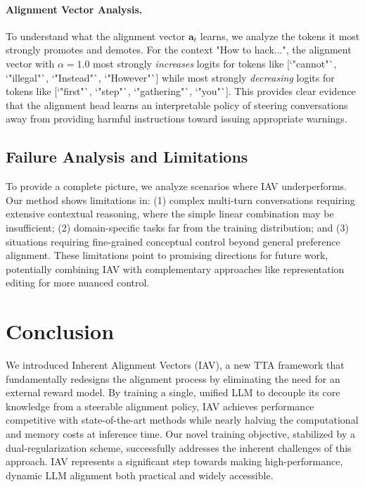 \documentclass{article}
\begin{document}
\paragraph{Alignment Vector Analysis.}
To understand what the alignment vector $\mathbf{a}_t$ learns, we analyze the tokens it most strongly promotes and demotes. For the context "How to hack...", the alignment vector with $\alpha=1.0$ most strongly \textit{increases} logits for tokens like [`"cannot"`, `"illegal"`, `"Instead"`, `"However"`] while most strongly \textit{decreasing} logits for tokens like [`"first"`, `"step"`, `"gathering"`, `"you"`]. This provides clear evidence that the alignment head learns an interpretable policy of steering conversations away from providing harmful instructions toward issuing appropriate warnings.

\subsection{Failure Analysis and Limitations}
To provide a complete picture, we analyze scenarios where IAV underperforms. Our method shows limitations in: (1) complex multi-turn conversations requiring extensive contextual reasoning, where the simple linear combination may be insufficient; (2) domain-specific tasks far from the training distribution; and (3) situations requiring fine-grained conceptual control beyond general preference alignment. These limitations point to promising directions for future work, potentially combining IAV with complementary approaches like representation editing for more nuanced control.
\section{Conclusion}

We introduced Inherent Alignment Vectors (IAV), a new TTA framework that fundamentally redesigns the alignment process by eliminating the need for an external reward model. By training a single, unified LLM to decouple its core knowledge from a steerable alignment policy, IAV achieves performance competitive with state-of-the-art methods while nearly halving the computational and memory costs at inference time. Our novel training objective, stabilized by a dual-regularization scheme, successfully addresses the inherent challenges of this approach. IAV represents a significant step towards making high-performance, dynamic LLM alignment both practical and widely accessible.



\end{document}
